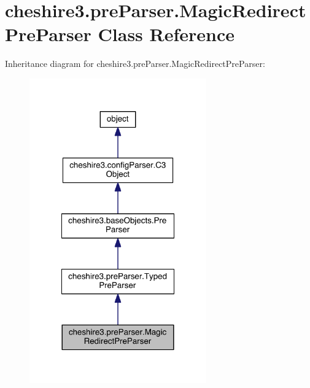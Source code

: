 \hypertarget{classcheshire3_1_1pre_parser_1_1_magic_redirect_pre_parser}{\section{cheshire3.\-pre\-Parser.\-Magic\-Redirect\-Pre\-Parser Class Reference}
\label{classcheshire3_1_1pre_parser_1_1_magic_redirect_pre_parser}
}


Inheritance diagram for cheshire3.\-pre\-Parser.\-Magic\-Redirect\-Pre\-Parser\-:
\nopagebreak
\begin{figure}[H]
\begin{center}
\leavevmode
\includegraphics[width=216pt]{classcheshire3_1_1pre_parser_1_1_magic_redirect_pre_parser__inherit__graph}
\end{center}
\end{figure}


